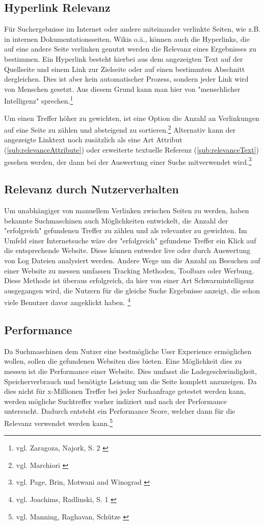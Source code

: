 \subsection{Hyperlink Relevanz}
\label{sub:relevanceHyperlink}
Für Suchergebnisse im Internet oder andere miteinander verlinkte Seiten, wie z.B. in internen Dokumentationsseiten, Wikis o.ä., können auch die Hyperlinks,
die auf eine andere Seite verlinken genutzt werden die Relevanz eines Ergebnisses zu bestimmen.
Ein Hyperlink besteht hierbei aus dem angezeigten Text auf der Quellseite und einem Link zur Zielseite oder auf einen bestimmten Abschnitt dergleichen. Dies ist aber kein automatischer Prozess, sondern jeder Link wird von Menschen gesetzt. Aus diesem Grund kann man hier von "menschlicher Intelligenz" sprechen.\footnote{vgl. Zaragoza, Najork, S. 2 \cite{zaragoza2018}}

Um einen Treffer höher zu gewichten, ist eine Option die Anzahl an Verlinkungen auf eine Seite zu zählen und absteigend zu sortieren.\footnote{vgl. Marchiori \cite{marchiori1997}}
Alternativ kann der angezeigte Linktext noch zusätzlich als eine Art Attribut (\ref{sub:relevanceAttribute}) oder erweiterte textuelle Referenz (\ref{sub:relevanceText}) gesehen werden, der dann bei der Auswertung einer Suche mitverwendet wird.\footnote{vgl. Page, Brin, Motwani and Winograd \cite{ilprints422}}

\subsection{Relevanz durch Nutzerverhalten}
\label{sub:relevanceUser}
Um unabhängiger von manuellem Verlinken zwischen Seiten zu werden, haben bekannte Suchmaschinen auch Möglichkeiten entwickelt, die Anzahl der "erfolgreich" gefundenen Treffer zu zählen und als relevanter zu gewichten.
Im Umfeld einer Internetsuche wäre der "erfolgreich" gefundene Treffer ein Klick auf die entsprechende Website.
Diese können entweder live oder durch Auswertung von Log Dateien analysiert werden. Andere Wege um die Anzahl an Besuchen auf einer Website zu messen umfassen Tracking Methoden, Toolbars oder Werbung.
Diese Methode ist überaus erfolgreich, da hier von einer Art Schwarmintelligenz ausgegangen wird, die Nutzern für die gleiche Suche Ergebnisse anzeigt, die schon viele Benutzer davor angeklickt haben. \footnote{vgl. Joachims, Radlinski, S. 1 \cite{joachims2007}}

\subsection{Performance}
\label{sub:relevancePerformance}
Da Suchmaschinen dem Nutzer eine bestmögliche User Experience ermöglichen wollen, sollen die gefundenen Websiten dies bieten. Eine Möglichkeit dies zu messen ist die Performance einer Website.
Dies umfasst die Ladegeschwindigkeit, Speicherverbrauch und benötigte Leistung um die Seite komplett anzuzeigen.
Da dies nicht für x-Millionen Treffer bei jeder Suchanfrage getestet werden kann, werden mögliche Suchtreffer vorher indiziert und nach der Performance untersucht.
Dadurch entsteht ein Performance Score, welcher dann für die Relevanz verwendet werden kann.\footnote{vgl. Manning, Raghavan, Schütze \cite{manning2008}}

